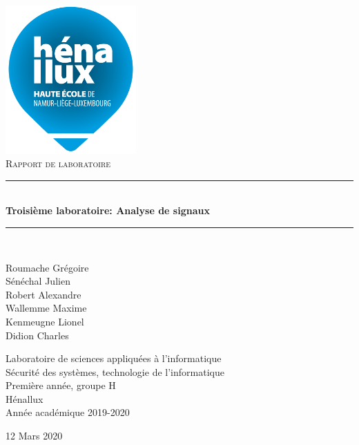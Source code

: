 \documentclass[a4paper]{article}
\newcommand{\HRule}{\rule{\linewidth}{0.5mm}}
\newcommand{\bgimg}[1]{
\AddToShipoutPicture
   {
      \put(\LenToUnit{0 cm},\LenToUnit{0 cm})
      {
            \texttt{[image: \#1]} 
      }
   }
}
\begin{document}

















\begin{titlepage}
  \begin{sffamily}
  \begin{center}
    \includegraphics[width=5cm]{LogoHenallux.PNG}~\\[1.5cm]
    \textsc{\Large Rapport de laboratoire}\\[1.5cm]
    \HRule \\[0.4cm]
    { \huge \bfseries Troisième laboratoire: Analyse de signaux\\[0.4cm] }
    \HRule \\[2cm]
    \begin{minipage}{0.4\textwidth}
      \begin{flushleft} \large
        Roumache Grégoire\\
        Sénéchal Julien\\
        Robert Alexandre\\
        Wallemme Maxime\\
        Kenmeugne Lionel\\
        Didion Charles
      \end{flushleft}
    \end{minipage}
    \begin{minipage}{0.55\textwidth}
      \begin{flushright} \large
    	Laboratoire de sciences appliquées à l'informatique\\
		Sécurité des systèmes, technologie de l'informatique\\
		Première année, groupe H \\
		Hénallux\\
		Année académique 2019-2020\\
      \end{flushright}
    \end{minipage}
    \vfill
    {\large 12 Mars 2020}
  \end{center}
  \end{sffamily}
\end{titlepage}
\end{document}
